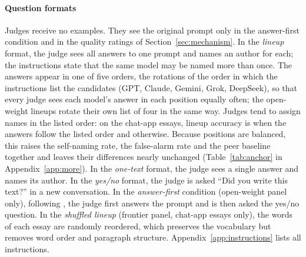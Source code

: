 \paragraph{Question formats}
Judges receive no examples. They see the original prompt only in the
answer-first condition and in the quality ratings of
Section~\ref{sec:mechanism}. In the \emph{lineup} format, the judge sees all
answers to one prompt and names an author for each; the instructions state that
the same model may be named more than once. The answers appear in one of five
orders, the rotations of the order in which the instructions list the
candidates (GPT, Claude, Gemini, Grok, DeepSeek), so that every judge sees each
model's answer in each position equally often; the open-weight lineups rotate
their own list of four in the same way. Judges tend to assign names in the
listed order: on the chat-app essays, lineup accuracy is \CRAccListedChat{}
when the answers follow the listed order and \CRAccOtherChat{} otherwise.
Because positions are balanced, this raises the self-naming rate, the
false-alarm rate and the peer baseline together and leaves their differences
nearly unchanged (Table~\ref{tab:anchor} in Appendix~\ref{app:more}). In the
\emph{one-text} format, the judge sees a single answer and names its author. In the \emph{yes/no} format, the judge is asked ``Did you write this
text?'' in a new conversation. In the \emph{answer-first} condition (open-weight
panel only), following \citet{khullar2026selfattribution}, the judge first
answers the prompt and is then asked the yes/no question. In the \emph{shuffled
lineup} (frontier panel, chat-app essays only), the words of each essay are
randomly reordered, which preserves the vocabulary but removes word order and
paragraph structure. Appendix~\ref{app:instructions} lists all instructions.

